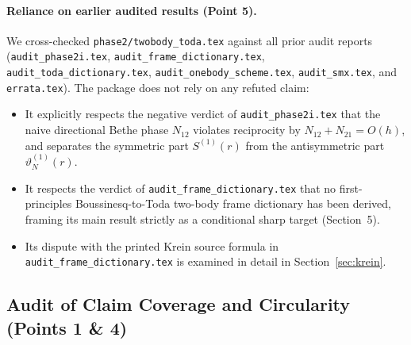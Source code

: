 \documentclass[11pt,a4paper]{article}
\begin{document}
\paragraph{Reliance on earlier audited results (Point 5).}
We cross-checked \texttt{phase2/twobody\_toda.tex} against all prior audit reports (\texttt{audit\_phase2i.tex}, \texttt{audit\_frame\_dictionary.tex}, \texttt{audit\_toda\_dictionary.tex}, \texttt{audit\_onebody\_scheme.tex}, \texttt{audit\_smx.tex}, and \texttt{errata.tex}). The package does not rely on any refuted claim:
\begin{itemize}[leftmargin=2em]
  \item It explicitly respects the negative verdict of \texttt{audit\_phase2i.tex} that the naive directional Bethe phase $N_{12}$ violates reciprocity by $N_{12}+N_{21}=O(h)$, and separates the symmetric part $S^{(1)}(r)$ from the antisymmetric part $\vartheta_N^{(1)}(r)$.
  \item It respects the verdict of \texttt{audit\_frame\_dictionary.tex} that no first-principles Boussinesq-to-Toda two-body frame dictionary has been derived, framing its main result strictly as a conditional sharp target (Section~5).
  \item Its dispute with the printed Krein source formula in \texttt{audit\_frame\_dictionary.tex} is examined in detail in Section~\ref{sec:krein}.
\end{itemize}

\subsection{Audit of Claim Coverage and Circularity (Points 1 \& 4)}
\end{document}
